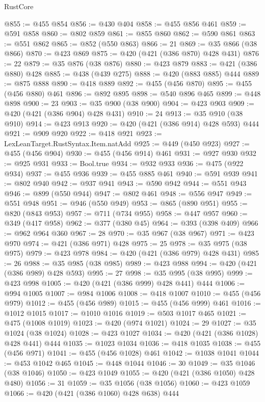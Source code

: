 \begin{lexlean}{RustCore}
\begin{coremodule}
@855 := @455 @854
@856 := @430 @404
@858 := @455 @856 @461
@859 := @591 @858
@860 := @802 @859
@861 := @855 @860
@862 := @590 @861
@863 := @551 @862
@865 := @852 (@550 @863)
@866 := 21
@869 := @35 @866 (@38 @866)
@870 := @423 @869
@875 := @420 (@421 (@386 @870) @428 @431)
@876 := 22
@879 := @35 @876 (@38 @876)
@880 := @423 @879
@883 := @421 (@386 @880) @428
@885 := @438 (@439 @275)
@888 := @420 (@883 @885) @444
@889 := @875 @888
@890 := @418 @889
@892 := @455 (@456 @870)
@895 := @455 (@456 @880) @461
@896 := @892 @895
@898 := @540 @896 @465
@899 := @448 @898
@900 := 23
@903 := @35 @900 (@38 @900)
@904 := @423 @903
@909 := @420 (@421 (@386 @904) @428 @431)
@910 := 24
@913 := @35 @910 (@38 @910)
@914 := @423 @913
@920 := @420 (@421 (@386 @914) @428 @593) @444
@921 := @909 @920
@922 := @418 @921
@923 := LexLeanTarget.RustSyntax.Item.natAdd
@925 := @449 (@450 @923)
@927 := @455 (@456 @904)
@930 := @455 (@456 @914) @461
@931 := @927 @930
@932 := @925 @931
@933 := Bool.true
@934 := @932 @933
@936 := @475 (@922 @934)
@937 := @455 @936
@939 := @455 @885 @461
@940 := @591 @939
@941 := @802 @940
@942 := @937 @941
@943 := @590 @942
@944 := @551 @943
@946 := @899 (@550 @944)
@947 := @802 @461
@948 := @556 @947
@949 := @551 @948
@951 := @946 (@550 @949)
@953 := @865 (@890 @951)
@955 := @820 (@843 @953)
@957 := @711 (@734 @955)
@958 := @447 @957
@960 := @349 (@417 @958)
@962 := @377 (@380 @45)
@964 := @393 (@398 @409)
@966 := @962 @964 @360
@967 := 28
@970 := @35 @967 (@38 @967)
@971 := @423 @970
@974 := @421 (@386 @971) @428
@975 := 25
@978 := @35 @975 (@38 @975)
@979 := @423 @978
@984 := @420 (@421 (@386 @979) @428 @431)
@985 := 26
@988 := @35 @985 (@38 @985)
@989 := @423 @988
@994 := @420 (@421 (@386 @989) @428 @593)
@995 := 27
@998 := @35 @995 (@38 @995)
@999 := @423 @998
@1005 := @420 (@421 (@386 @999) @428 @441) @444
@1006 := @994 @1005
@1007 := @984 @1006
@1008 := @418 @1007
@1010 := @455 (@456 @979)
@1012 := @455 (@456 @989)
@1015 := @455 (@456 @999) @461
@1016 := @1012 @1015
@1017 := @1010 @1016
@1019 := @503 @1017 @465
@1021 := @475 (@1008 @1019)
@1023 := @420 (@974 @1021)
@1024 := 29
@1027 := @35 @1024 (@38 @1024)
@1028 := @423 @1027
@1034 := @420 (@421 (@386 @1028) @428 @441) @444
@1035 := @1023 @1034
@1036 := @418 @1035
@1038 := @455 (@456 @971)
@1041 := @455 (@456 @1028) @461
@1042 := @1038 @1041
@1044 := @453 @1042 @465
@1045 := @448 @1044
@1046 := 30
@1049 := @35 @1046 (@38 @1046)
@1050 := @423 @1049
@1055 := @420 (@421 (@386 @1050) @428 @480)
@1056 := 31
@1059 := @35 @1056 (@38 @1056)
@1060 := @423 @1059
@1066 := @420 (@421 (@386 @1060) @428 @638) @444

\end{coremodule}
\end{lexlean}
